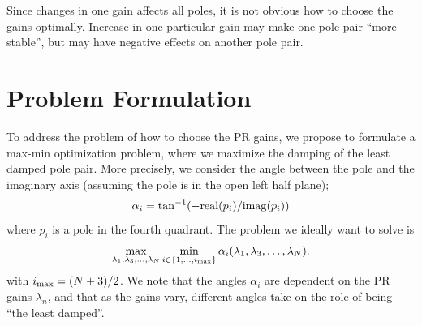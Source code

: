 \documentclass[conference,10pt]{IEEEtran}
\begin{document}
Since changes in one gain affects all poles, it is not obvious how to choose the gains optimally. Increase in one particular gain may make one pole pair ``more stable'', but may have negative effects on another pole pair.






\section{Problem Formulation}
To address the problem of how to choose the PR gains, we propose to formulate a max-min optimization problem, where we maximize the damping of the least damped pole pair. More precisely, we consider the angle between the pole and the imaginary axis (assuming the pole is in the open left half plane);
\begin{align*}
\alpha_i = \tan^{-1}(-{\rm real}(p_i) / {\rm imag}(p_i))
\end{align*}
where $p_i$ is a pole in the fourth quadrant. The problem we ideally want to solve is
\begin{align}
\label{eq:MaxMinProb}
\max_{\lambda_1,\lambda_3,\dots, \lambda_N}\min_{i\in \{1, \dots, i_{\rm max}\}} \alpha_i(\lambda_1,\lambda_3,\dots, \lambda_N).
\end{align}
with $i_{\rm max} = (N+3)/2$. We note that the angles $\alpha_i$ are dependent on the PR gains $\lambda_n$, and that as the gains vary, different angles take on the role of being ``the least damped''.

\end{document}
